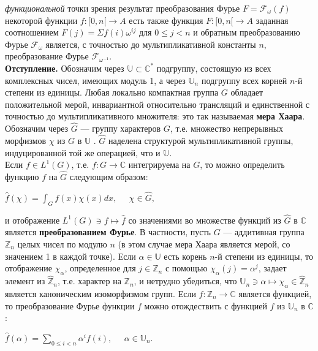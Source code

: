 \documentclass{mai_book}
\begin{document}
\textit{функциональной} точки зрения результат преобразования Фурье $F = \mathcal{F}_{\omega} (f)$
некоторой функции $f:[0,n[ \longrightarrow A$ есть также функция $F:[0,n[ \longrightarrow A$
заданная соотношением $F(j) = \Sigma f(i) \omega^{ij}$ для $0 \leq j < n$ и обратным
преобразованию Фурье $\mathcal{F}_{\omega}$ является, с точностью до 
мультипликативной константы $n$, преобразование Фурье $\mathcal{F}_{\omega^{-1}}$.\bigskip \\
\textbf{Отступление.} \newline
Обозначим через $\mathbb{U} \subset \mathbb{C}^{*}$ подгруппу, состоящую из всех 
комплексных чисел, имеющих модуль 1, а через $\mathbb{U}_{n}$ подгруппу всех
корней $n$-й степени из единицы. Любая локально компактная
группа $G$ обладает положительной мерой, инвариантной 
относительно трансляций и единственной с точностью до 
мультипликативного множителя: это так называемая \textbf{мера Хаара}.\\
Обозначим через $ \hat{G}$ — группу характеров $G$, т.е. множество
непрерывных морфизмов $\chi$ из $G$ в $\mathbb{U}$ . $ \hat{G}$ наделена структурой
мультипликативной группы, индуцированной той же операцией,
что и $\mathbb{U}$.\\
Если $f \in L^1 (G)$, т.е. $f : G \rightarrow \mathbb{C}$ интегрируема на $G$, то можно
определить функцию $f$ на $ \hat{G}$ следующим образом: \\
\begin{center}
$\hat{f}(\chi) = \int_{G}^{} f(x) \chi(x) dx  ,\;\;\;\;\; \chi \in \hat{G},   $
\end{center}
и отображение $L^1 (G) \ni f \longmapsto \hat{f}$ со значениями во множестве
функций из $\hat{G}$ в $\mathbb{C}$ является \textbf{преобразованием Фурье}.
В частности, пусть $G$ — аддитивная группа $\mathbb{Z}_n$ целых чисел
по модулю $n$ (в этом случае мера Хаара является мерой, со 
значением 1 в каждой точке). Если $\alpha \in \mathbb{U}$ есть корень $n$-й степени из
единицы, то отображение $\chi_{\alpha}$, определенное для $j \in \mathbb{Z}_n$ с помощью
$ \chi_{\alpha}(j) = {\alpha}^j$, задает элемент из $\hat{\mathbb{Z}}_n$, т.е. характер на $\mathbb{Z}_n$, и 
нетрудно убедиться, что $\mathbb{U}_n \ni \alpha \longmapsto \chi_{\alpha} \in \hat{\mathbb{Z}}_n$ является каноническим
изоморфизмом групп. Если $f: \mathbb{Z}_n \rightarrow \mathbb{C}$ является функцией, то
преобразование Фурье функции $f$ можно отождествить с 
функцией $\hat{f}$  из $\mathbb{U}_n$ в $\mathbb{C}$:\\
\begin{center}
$\hat{f}(\alpha) = \sum\limits_{0 \leq i < n} \alpha^{i} f(i), \;\;\;\;\; \alpha \in \mathbb{U}_n.$
\end{center}
\end{document}
